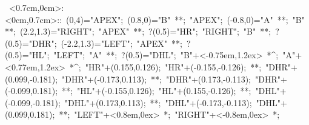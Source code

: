 %

\hbox{
\xy    <0.7cm,0cm>:<0cm,0.7cm>::
       (0,4)="APEX"; (0.8,0)="B" **\dir{-};
       "APEX"; (-0.8,0)="A" **\dir{-}; "B" **\dir{-};
       (2.2,1.3)="RIGHT"; "APEX" **\dir{-}; ?(0.5)="HR";
       "RIGHT"; "B" **\dir{-}; ?(0.5)="DHR";
       (-2.2,1.3)="LEFT"; "APEX" **\dir{-}; ?(0.5)="HL";
       "LEFT"; "A" **\dir{-}; ?(0.5)="DHL";
       "B"+<-0.75em,1.2ex> *{^\circ};
       "A"+<0.77em,1.2ex> *{^\circ};
%
       "HR"+(0.155,0.126); "HR"+(-0.155,-0.126); **\dir{-};
       "DHR"+(0.099,-0.181); "DHR"+(-0.173,0.113); **\dir{-};
       "DHR"+(0.173,-0.113); "DHR"+(-0.099,0.181); **\dir{-};
       "HL"+(-0.155,0.126); "HL"+(0.155,-0.126); **\dir{-};
       "DHL"+(-0.099,-0.181); "DHL"+(0.173,0.113); **\dir{-};
       "DHL"+(-0.173,-0.113); "DHL"+(0.099,0.181); **\dir{-};
%
       "LEFT"+<0.8em,0ex> *{};
       "RIGHT"+<-0.8em,0ex> *{};
\endxy}
